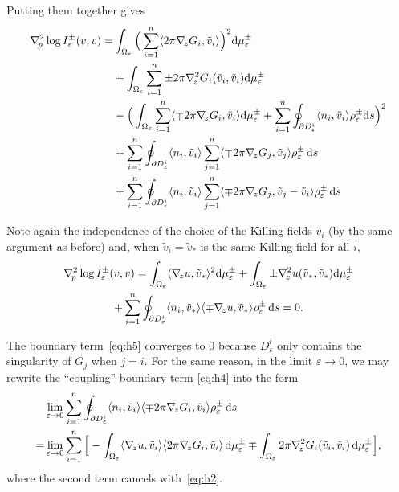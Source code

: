 \documentclass[a4paper]{amsart}
\newcommand{\Hess}{\nabla^2}
\newcommand{\dd}{{\rm d}}
\theoremstyle{plain} %
\theoremstyle{definition} %
\theoremstyle{remark}
\begin{document}
Putting them together gives
\begin{align}
	\Hess_{\! p} \log I^\pm_\varepsilon (v, v)
	=& \int_{\Omega_\varepsilon} \Big( \sum_{i=1}^n \langle 2\pi \nabla_{\! z} G_i, \tilde v_i \rangle \Big)^2 \dd\mu_\varepsilon^\pm \label{eq:h1}\\
	&+ \int_{\Omega_\varepsilon} \sum_{i=1}^n \pm 2\pi \Hess_{\! z} G_i (\tilde v_i, \tilde v_i) \dd\mu_\varepsilon^\pm  \label{eq:h2}\\
	&- \Big(
		\int_{\Omega_\varepsilon} \sum_{i=1}^n \langle \mp 2\pi \nabla_{\! z} G_i, \tilde v_i \rangle \dd\mu_\varepsilon^\pm
		+ \sum_{i=1}^n \oint_{\partial D^i_\varepsilon} \langle n_i, \tilde v_i \rangle \rho_\varepsilon^\pm \dd s
	\Big)^2 \label{eq:h3}\\
	&+ \sum_{i=1}^n \oint_{\partial D^i_\varepsilon} \langle n_i, \tilde v_i \rangle \sum_{j=1}^n \langle \mp 2\pi \nabla_{\! z} G_j, \tilde v_j \rangle \rho_\varepsilon^\pm \, \dd s  \label{eq:h4}\\
	&+ \sum_{i=1}^n \oint_{\partial D^i_\varepsilon} \langle n_i, \tilde v_i \rangle \sum_{j=1}^n \langle \mp 2\pi \nabla_{\! z} G_j, \tilde v_j - \tilde v_i \rangle \rho_\varepsilon^\pm \, \dd s \label{eq:h5}
\end{align}

Note again the independence of the choice of the Killing fields $\tilde v_i$
(by the same argument as before) and, when $\tilde v_i = \tilde v_*$ is the
same Killing field for all $i$,
\begin{multline*}
	\Hess_{\! p} \log I^\pm_\varepsilon (v, v)
	= \int_{\Omega_\varepsilon} \langle \nabla_{\! z} u, \tilde v_* \rangle^2 \dd\mu_\varepsilon^\pm
	+ \int_{\Omega_\varepsilon} \pm \Hess_{\! z} u (\tilde v_*, \tilde v_*) \dd\mu_\varepsilon^\pm\\
	+ \sum_{i=1}^n \oint_{\partial D^i_\varepsilon} \langle n_i, \tilde v_* \rangle \langle \mp \nabla_{\! z} u, \tilde v_* \rangle \rho_\varepsilon^\pm \, \dd s = 0.
\end{multline*}

The boundary term~\eqref{eq:h5} converges to $0$ because
$D^i_\varepsilon$ only contains the singularity of $G_j$ when $j=i$.  For the
same reason, in the limit $\varepsilon \to 0$, we may rewrite the ``coupling''
boundary term \eqref{eq:h4} into the form
\begin{align*}
	&\lim_{\varepsilon \to 0} \sum_{i=1}^n \oint_{\partial D^i_\varepsilon} \langle n_i, \tilde v_i \rangle \langle \mp 2\pi \nabla_{\! z} G_i, \tilde v_i \rangle \rho_\varepsilon^\pm \, \dd s\\
	=&\lim_{\varepsilon \to 0} \sum_{i=1}^n \Big[
		- \int_{\Omega_\varepsilon} \langle \nabla_{\! z} u, \tilde v_i \rangle \langle 2\pi \nabla_{\! z} G_i, \tilde v_i \rangle \, \dd \mu_\varepsilon^\pm
		\mp \int_{\Omega_\varepsilon} 2\pi \Hess_{\! z} G_i (\tilde v_i, \tilde v_i) \, \dd \mu_\varepsilon^\pm
	\Big],
\end{align*}
where the second term cancels with~\eqref{eq:h2}.
\end{document}
